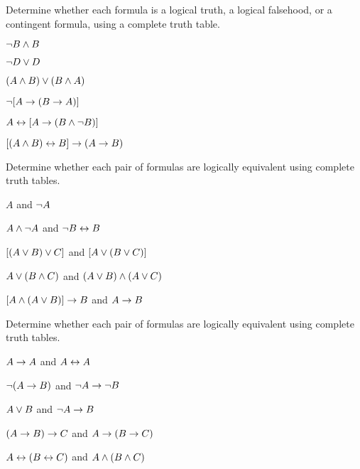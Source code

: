 \documentclass[PHIL101-Textbook.tex]{subfiles}
\begin{document}
\noindent\problempart Determine whether each formula is a logical truth, a logical falsehood, or a contingent formula, using a complete truth table.
\begin{earg}
\item $\neg B \land B$ \vspace{.5ex}%
\item $\neg D \vee D$ \vspace{.5ex}%
\item $(A\land B) \vee (B\land A)$\vspace{.5ex} %
\item $\neg[A \rightarrow (B \rightarrow A)]$\vspace{.5ex} %
\item $A \leftrightarrow [A \rightarrow (B \land \neg B)]$ \vspace{.5ex}%
\item $[(A \land B) \leftrightarrow B] \rightarrow (A \rightarrow B)$ \vspace{.5ex}%
\end{earg}



\noindent\problempart
\label{pr.TT.equiv}
Determine whether each pair of formulas are logically equivalent using complete truth tables. %
\begin{earg}
\item $A$ and $\neg A$
\item $A \land \neg A$ and $\neg B \leftrightarrow B$
\item $[(A \vee B) \vee C]$ and $[A \vee (B \vee C)]$
\item $A \vee (B \land C)$ and $(A \vee B) \land (A \vee C)$
\item $[A \land (A \vee B)] \rightarrow B$ and $A \rightarrow B$\end{earg}


\noindent\problempart
\label{pr.TT.equiv2}
Determine whether each pair of formulas are logically equivalent using complete truth tables. %
\begin{earg}
\item $A\rightarrow A$ and $A \leftrightarrow A$ \vspace{.5ex}
\item $\neg(A \rightarrow B)$ and $\neg A \rightarrow \neg B$ \vspace{.5ex}
\item $A \vee B$ and $\neg A \rightarrow B$ \vspace{.5ex}
\item$(A \rightarrow B) \rightarrow C$ and $A \rightarrow (B \rightarrow C)$ \vspace{.5ex}
\item $A \leftrightarrow (B \leftrightarrow C)$ and $A \land (B \land C)$ \vspace{.5ex}
\end{earg}
\end{document}
